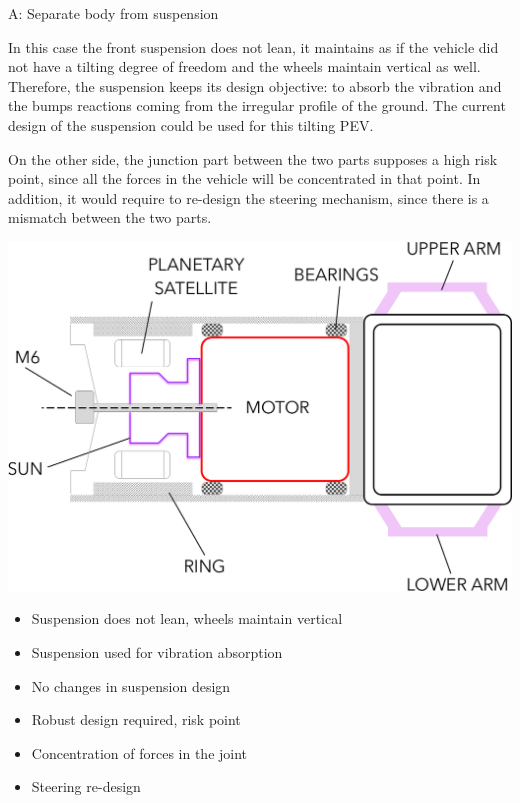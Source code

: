 \textcolor{Bittersweet}{A: Separate body from suspension}

In this case the front suspension does not lean, it maintains as if the vehicle did not have a tilting degree of freedom and the wheels maintain vertical as well. Therefore, the suspension keeps its design objective: to absorb the vibration and the bumps reactions coming from the irregular profile of the ground. The current design of the suspension could be used for this tilting PEV. 

On the other side, the junction part between the two parts supposes a high risk point, since all the forces in the vehicle will be concentrated in that point. In addition, it would require to re-design the steering mechanism, since there is a mismatch between the two parts.
\begin{marginfigure}
	\includegraphics[width=1.2\linewidth]{figs/04/a_option}
	\caption{Design proposal in the joint with option A}
\end{marginfigure}
\begin{itemize}
\begin{itemize}\itemsep -10pt
    \item[$\textcolor{Green}{\surd}$] Suspension does not lean, wheels maintain vertical
    \item[$\textcolor{Green}{\surd}$] Suspension used for vibration absorption
    \item[$\textcolor{Green}{\surd}$] No changes in suspension design
\end{itemize}
\end{itemize}

\begin{itemize}
\begin{itemize}\itemsep -10pt
    \item[$\textcolor{Red}{\times}$] Robust design required, risk point
    \item[$\textcolor{Red}{\times}$] Concentration of forces in the joint
    \item[$\textcolor{Red}{\times}$] Steering re-design
\end{itemize}
\end{itemize}


